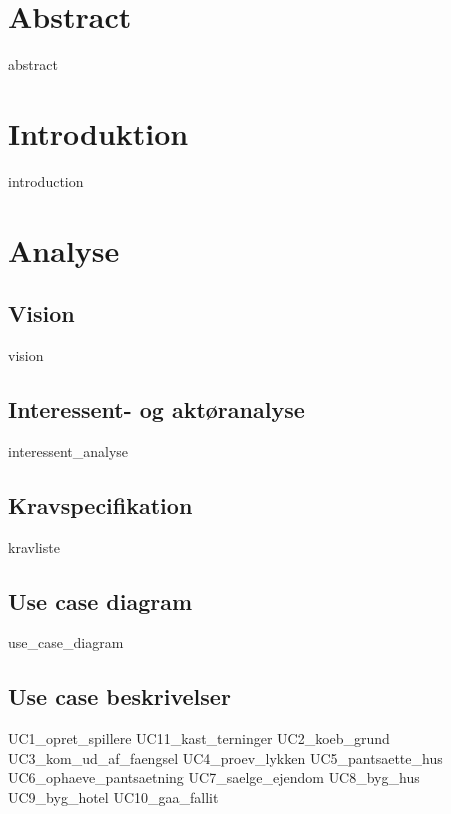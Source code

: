 \documentclass{article}
\begin{document}
{\selectfont

\thispagestyle{empty}
\newpage
\section*{Abstract}
{abstract}
\thispagestyle{empty}
\newpage
\tableofcontents
\thispagestyle{empty}
\newpage
\clearpage
\setcounter{page}{1}

\section{Introduktion}
{introduction}

\section{Analyse}
\subsection{Vision}
{vision}

\subsection{Interessent- og aktøranalyse}
{interessent_analyse}
\subsection{Kravspecifikation}
{kravliste}

\subsection{Use case diagram}
{use_case_diagram}
\newpage
\subsection{Use case beskrivelser}
{UC1_opret_spillere}
{UC11_kast_terninger}
{UC2_koeb_grund}
{UC3_kom_ud_af_faengsel}
{UC4_proev_lykken}
{UC5_pantsaette_hus}
{UC6_ophaeve_pantsaetning}
{UC7_saelge_ejendom}
{UC8_byg_hus}
{UC9_byg_hotel}
{UC10_gaa_fallit}
\newpage
}
\end{document}
